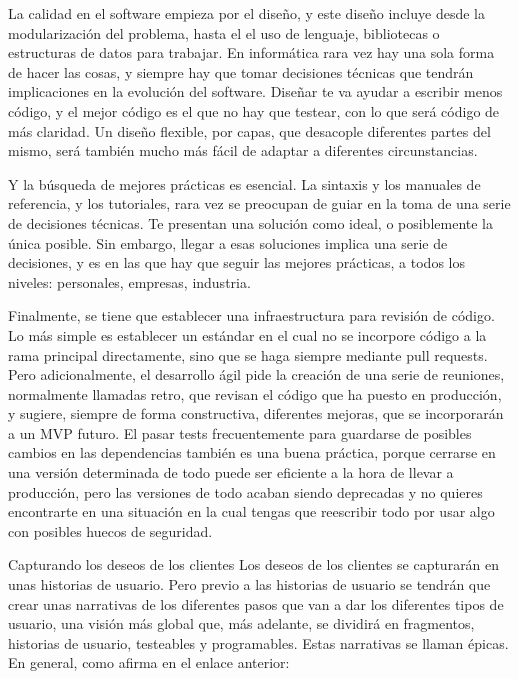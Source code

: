 \begin{itemize}
La calidad en el software empieza por el diseño, y este 
diseño incluye desde la modularización del problema, 
hasta el el uso de lenguaje, bibliotecas o estructuras 
de datos para trabajar. En informática rara vez hay 
una sola forma de hacer las cosas, y siempre hay que 
tomar decisiones técnicas que tendrán implicaciones 
en la evolución del software. Diseñar te va ayudar 
a escribir menos código, y el mejor código es el 
que no hay que testear, con lo que será código de 
más claridad. Un diseño flexible, por capas, que 
desacople diferentes partes del mismo, será también 
mucho más fácil de adaptar a diferentes circunstancias.

Y la búsqueda de mejores prácticas es esencial. La 
sintaxis y los manuales de referencia, y los tutoriales, 
rara vez se preocupan de guiar en la toma de una serie 
de decisiones técnicas. Te presentan una solución como 
ideal, o posiblemente la única posible. Sin embargo, 
llegar a esas soluciones implica una serie de decisiones, 
y es en las que hay que seguir las mejores prácticas, 
a todos los niveles: personales, empresas, industria.

Finalmente, se tiene que establecer una infraestructura 
para revisión de código. Lo más simple es establecer 
un estándar en el cual no se incorpore código a la 
rama principal directamente, sino que se haga 
siempre mediante pull requests. Pero adicionalmente, 
el desarrollo ágil pide la creación de una serie de 
reuniones, normalmente llamadas retro, que revisan 
el código que ha puesto en producción, y sugiere, 
siempre de forma constructiva, diferentes mejoras, que 
se incorporarán a un MVP futuro. El pasar tests 
frecuentemente para guardarse de posibles cambios 
en las dependencias también es una buena práctica, 
porque cerrarse en una versión determinada de todo 
puede ser eficiente a la hora de llevar a producción, 
pero las versiones de todo acaban siendo deprecadas y
no quieres encontrarte en una situación en la cual 
tengas que reescribir todo por usar algo con posibles huecos de seguridad.

\end{itemize}

Capturando los deseos de los clientes
Los deseos de los clientes se capturarán en unas historias de usuario. 
Pero previo a las historias de usuario se tendrán que crear unas 
narrativas de los diferentes pasos que van a dar los diferentes 
tipos de usuario, una visión más global que, más adelante, se 
dividirá en fragmentos, historias de usuario, testeables y 
programables. Estas narrativas se llaman épicas. En general, 
como afirma en el enlace anterior:

